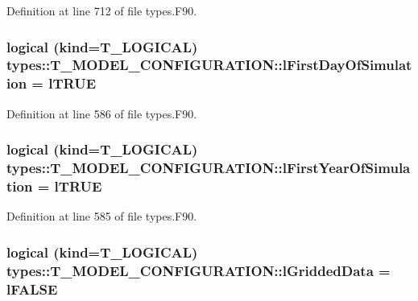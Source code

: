 Definition at line 712 of file types.F90.

\hypertarget{typetypes_1_1_t___m_o_d_e_l___c_o_n_f_i_g_u_r_a_t_i_o_n_a3805cad83771c4cd33145715c801a203}{
\subsubsection[{lFirstDayOfSimulation}]{\setlength{\rightskip}{0pt plus 5cm}logical (kind={\bf T\_\-LOGICAL}) {\bf types::T\_\-MODEL\_\-CONFIGURATION::lFirstDayOfSimulation} = {\bf lTRUE}}}
\label{typetypes_1_1_t___m_o_d_e_l___c_o_n_f_i_g_u_r_a_t_i_o_n_a3805cad83771c4cd33145715c801a203}


Definition at line 586 of file types.F90.

\hypertarget{typetypes_1_1_t___m_o_d_e_l___c_o_n_f_i_g_u_r_a_t_i_o_n_a7f6848b9bf415dbd66f9b955d0d3efa0}{
\subsubsection[{lFirstYearOfSimulation}]{\setlength{\rightskip}{0pt plus 5cm}logical (kind={\bf T\_\-LOGICAL}) {\bf types::T\_\-MODEL\_\-CONFIGURATION::lFirstYearOfSimulation} = {\bf lTRUE}}}
\label{typetypes_1_1_t___m_o_d_e_l___c_o_n_f_i_g_u_r_a_t_i_o_n_a7f6848b9bf415dbd66f9b955d0d3efa0}


Definition at line 585 of file types.F90.

\hypertarget{typetypes_1_1_t___m_o_d_e_l___c_o_n_f_i_g_u_r_a_t_i_o_n_ab6b943a08794ac6c33b2c5cd391abefd}{
\subsubsection[{lGriddedData}]{\setlength{\rightskip}{0pt plus 5cm}logical (kind={\bf T\_\-LOGICAL}) {\bf types::T\_\-MODEL\_\-CONFIGURATION::lGriddedData} = {\bf lFALSE}}}
\label{typetypes_1_1_t___m_o_d_e_l___c_o_n_f_i_g_u_r_a_t_i_o_n_ab6b943a08794ac6c33b2c5cd391abefd}



